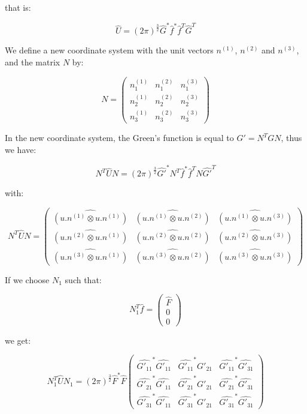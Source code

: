 \documentclass[main.tex]{subfiles}
\begin{document}
that is:

\begin{equation}
\hat{U} = (2 \pi)^{\frac{3}{2}} \hat{G}^* \hat{f}^* \hat{f}^T \hat{G}^T
\end{equation}

We define a new coordinate system with the unit vectors $n^{(1)}$, $n^{(2)}$ and $n^{(3)}$, and the matrix $N$ by:

\begin{equation}
N = \begin{pmatrix}
n_1^{(1)} & n_1^{(2)} & n_1^{(3)} \\
n_2^{(1)} & n_2^{(2)} & n_2^{(3)} \\
n_3^{(1)} & n_3^{(2)} & n_3^{(3)}
\end{pmatrix}
\end{equation}

In the new coordinate system, the Green's function is equal to $G' = N^T G N$, thus we have:

\begin{equation}
N^T \hat{U} N = (2 \pi)^{\frac{3}{2}} \hat{G'}^* N^T \hat{f}^* \hat{f}^T N \hat{G'}^T
\end{equation}

with:

\begin{equation}
N^T \hat{U} N = \begin{pmatrix}
\hat{(u . n^{(1)} \otimes u . n^{(1)})} & \hat{(u . n^{(1)} \otimes u . n^{(2)})} & \hat{(u . n^{(1)} \otimes u . n^{(3)})} \\
\hat{(u . n^{(2)} \otimes u . n^{(1)})} & \hat{(u . n^{(2)} \otimes u . n^{(2)})} & \hat{(u . n^{(2)} \otimes u . n^{(3)})} \\
\hat{(u . n^{(3)} \otimes u . n^{(1)})} & \hat{(u . n^{(3)} \otimes u . n^{(2)})} & \hat{(u . n^{(3)} \otimes u . n^{(3)})}
\end{pmatrix}
\end{equation}

If we choose $N_1$ such that:

\begin{equation}
N_1^T \hat{f} = \begin{pmatrix}
\hat{F} \\
0 \\
0
\end{pmatrix}
\end{equation}

we get:

\begin{equation}
N_1^T \hat{U} N_1 = (2 \pi)^{\frac{3}{2}} \hat{F}^* \hat{F} \begin{pmatrix}
\hat{G'_{11}}^* \hat{G'_{11}} & \hat{G'_{11}}^* \hat{G'_{21}} & \hat{G'_{11}}^* \hat{G'_{31}} \\
\hat{G'_{21}}^* \hat{G'_{11}} & \hat{G'_{21}}^* \hat{G'_{21}} & \hat{G'_{21}}^* \hat{G'_{31}} \\
\hat{G'_{31}}^* \hat{G'_{11}} & \hat{G'_{31}}^* \hat{G'_{21}} & \hat{G'_{31}}^* \hat{G'_{31}}
\end{pmatrix}
\end{equation}
\end{document}
